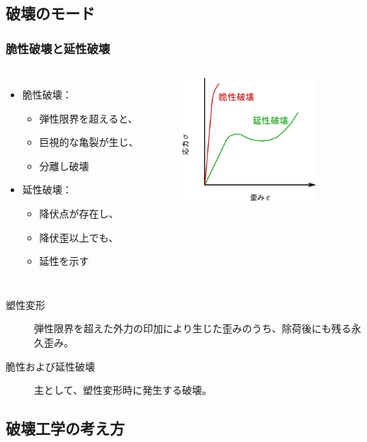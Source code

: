\documentclass[10pt, dvipdfmx]{beamer}
\begin{document}
\subsection{破壊のモード}
\begin{frame}
\frametitle{脆性破壊と延性破壊}

\begin{columns}[totalwidth=1\textwidth]
	\begin{itemize}
	\item 脆性破壊：
		\begin{itemize}
		\item 
		弾性限界を超えると、
		\item
		巨視的な亀裂が生じ、
		\item
		分離し破壊
		\end{itemize}
	\item 延性破壊：
		\begin{itemize}
		\item 
		降伏点が存在し、
		\item
		降伏歪以上でも、
		\item
		延性を示す
		\end{itemize}
	\end{itemize}
	\begin{figure}
	\centering
	\includegraphics[width=50mm]{S_S_Curve_2.png}
	\end{figure}
\end{columns}

\begin{description}
\item[塑性変形]
弾性限界を超えた外力の印加により生じた歪みのうち、除荷後にも残る永久歪み。
\item[脆性および延性破壊]
主として、塑性変形時に発生する破壊。
\end{description}
\end{frame}

\subsection{破壊工学の考え方}
\end{document}
